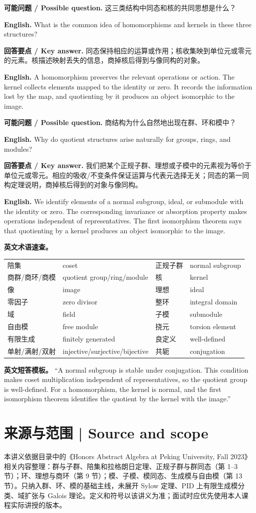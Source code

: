 \documentclass[UTF8,11pt,a4paper]{ctexart}
\newcommand{\EN}[1]{\par\noindent\textbf{English.} #1\par}
\newcommand{\ASK}[4]{\par\noindent\textbf{可能问题 / Possible question.} #1\par\EN{#2}\noindent\textbf{回答要点 / Key answer.} #3\par\EN{#4}\medskip}
\begin{document}
\ASK{这三类结构中同态和核的共同思想是什么？}{What is the common idea of homomorphisms and kernels in these three structures?}{同态保持相应的运算或作用；核收集映到单位元或零元的元素。核描述映射丢失的信息，商掉核后得到与像同构的对象。}{A homomorphism preserves the relevant operations or action. The kernel collects elements mapped to the identity or zero. It records the information lost by the map, and quotienting by it produces an object isomorphic to the image.}

\ASK{商结构为什么自然地出现在群、环和模中？}{Why do quotient structures arise naturally for groups, rings, and modules?}{我们把某个正规子群、理想或子模中的元素视为等价于单位元或零元。相应的吸收/不变条件保证运算与代表元选择无关；同态的第一同构定理说明，商掉核后得到的对象与像同构。}{We identify elements of a normal subgroup, ideal, or submodule with the identity or zero. The corresponding invariance or absorption property makes operations independent of representatives. The first isomorphism theorem says that quotienting by a kernel produces an object isomorphic to the image.}

\noindent\textbf{英文术语速查。}
\begin{center}
\begin{tabular}{ll|ll}
陪集 & coset & 正规子群 & normal subgroup\\
商群/商环/商模 & quotient group/ring/module & 核 & kernel\\
像 & image & 理想 & ideal\\
零因子 & zero divisor & 整环 & integral domain\\
域 & field & 子模 & submodule\\
自由模 & free module & 挠元 & torsion element\\
有限生成 & finitely generated & 良定义 & well-defined\\
单射/满射/双射 & injective/surjective/bijective & 共轭 & conjugation
\end{tabular}
\end{center}

\noindent\textbf{英文短答模板。} “A normal subgroup is stable under conjugation. This condition makes coset multiplication independent of representatives, so the quotient group is well-defined. For a homomorphism, the kernel is normal, and the first isomorphism theorem identifies the quotient by the kernel with the image.”

\section*{来源与范围 | Source and scope}
本讲义依据目录中的《Honors Abstract Algebra at Peking University, Fall 2023》相关内容整理：群与子群、陪集和拉格朗日定理、正规子群与群同态（第 1--3 节）；环、理想与商环（第 9 节）；模、子模、模同态、生成模与自由模（第 13 节）。只纳入群、环、模的基础主线，未展开 Sylow 定理、PID 上有限生成模分类、域扩张与 Galois 理论。定义和符号以该讲义为准；面试时应优先使用本人课程实际讲授的版本。
\end{document}

